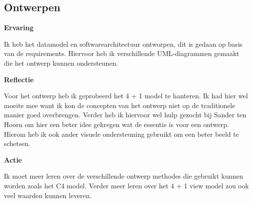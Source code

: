 \subsection{Ontwerpen}
\textbf{Ervaring}

\whitespace
Ik heb het datamodel en softwarearchitectuur ontworpen, dit is gedaan op basis van de requirements.
Hiervoor heb ik verschillende UML-diagrammen gemaakt die het ontwerp kunnen ondersteunen.

\whitespace
\textbf{Reflectie}

\whitespace
Voor het ontwerp heb ik geprobeerd het 4 + 1 model te hanteren. 
Ik had hier wel moeite mee want ik kon de concepten van het ontwerp niet op de traditionele manier goed overbrengen.
Verder heb ik hiervoor wel hulp gezocht bij Sander ten Hoorn om hier een beter idee gekregen wat de essentie is voor een ontwerp.  
Hierom heb ik ook ander visuele ondersteuning gebruikt om een beter beeld te schetsen.

\whitespace
\textbf{Actie}

\whitespace
Ik moet meer leren over de verschillende ontwerp methodes die gebruikt kunnen worden zoals het C4 model.
Verder meer leren over het 4 + 1 view model zou ook veel waarden kunnen leveren.
